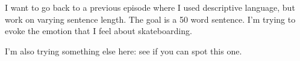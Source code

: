 

I want to go back to a previous episode where I used descriptive language, but work on varying sentence length. The goal is a 50 word sentence. I'm trying to evoke the emotion that I feel about skateboarding.

I'm also trying something else here: see if you can spot this one.
